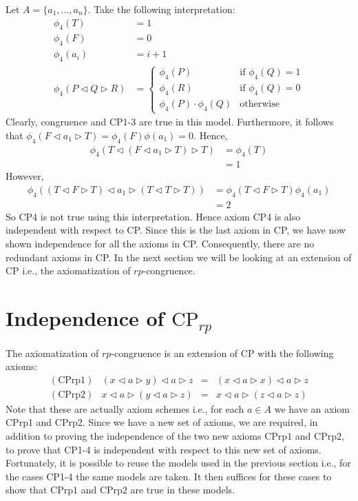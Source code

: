 \documentclass[a4paper,twoside,openright]{report}
\newcommand{\CPrp}[1]{\ensuremath{\mathrm{CPrp#1}}}
\newcommand{\lef}{\ensuremath{\triangleleft}}
\newcommand{\rig}{\ensuremath{\triangleright}}
\begin{document}
Let $A=\{a_1,\ldots,a_n\}$. Take the following interpretation:
\begin{align*}
\phi_4(T) &=1\\
\phi_4(F) &=0\\
\phi_4(a_i) &=i+1\\
\phi_4(P\lef Q\rig R) &=\begin{cases}
\phi_4(P) & \text{if $\phi_4(Q)=1$}\\
\phi_4(R) & \text{if $\phi_4(Q)=0$}\\
\phi_4(P)\cdot\phi_4(Q) & \text{otherwise}
\end{cases}
\end{align*}
Clearly, congruence and CP1-3 are true in this model. Furthermore, it follows that $\phi_4(F\lef a_1\rig T)=\phi_4(F)\phi(a_1)=0$. Hence,
\begin{align*}
\phi_4(T\lef(F\lef a_1\rig T)\rig T)
&=\phi_4(T)\\
&=1
\end{align*}
However,
\begin{align*}
\phi_4((T\lef F\rig T)\lef a_1\rig (T\lef T\rig T))
&=\phi_4(T\lef F\rig T)\phi_4(a_1)\\
&=2
\end{align*}
So CP4 is not true using this interpretation. Hence axiom CP4 is also independent with respect to CP. Since this is the last axiom in CP, we have now shown independence for all the axioms in CP. Consequently, there are no redundant axioms in CP. In the next section we will be looking at an extension of CP i.e., the axiomatization of $rp$-congruence.

\section{Independence of $\text{CP}_{rp}$}
The axiomatization of $rp$-congruence is an extension of CP with the following axioms:
\[
\begin{array}{lrcl}
(\CPrp1) & (x\lef a\rig y)\lef a\rig z & = & (x\lef a\rig x)\lef a\rig z\\
(\CPrp2) & x\lef a\rig (y\lef a\rig z) & = & x\lef a\rig(z\lef a\rig z)
\end{array}
\]
Note that these are actually axiom schemes i.e., for each $a\in A$ we have an axiom CPrp1 and CPrp2. Since we have a new set of axioms, we are required, in addition to proving the independence of the two new axioms \CPrp1 and \CPrp2, to prove that CP1-4 is independent with respect to this new set of axioms. Fortunately, it is possible to reuse the models used in the previous section i.e., for the cases CP1-4 the same models are taken. It then suffices for these cases to show that \CPrp1 and \CPrp2 are true in these models.
\end{document}

